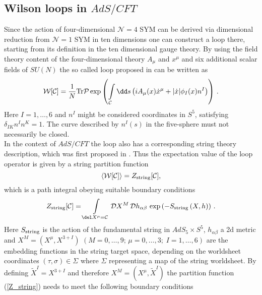 \subsection{Wilson loops in $AdS/CFT$}
Since the action of four-dimensional $\mathcal{N}=4$ SYM can be derived via dimensional reduction from $\mathcal{N}=1$ SYM in ten dimensions \cite{BRINK197777} one can construct a  loop there, starting from its definition in the ten dimensional gauge theory. By using the field theory content of the four-dimensional theory $A_{\mu}$ and $x^{\mu}$ and six additional scalar fields of $SU(N)$ the so called  loop proposed in \cite{maldacena2} can be written as
%
%
\begin{equation}
\mathcal{W}[\mathcal{C}] = \frac{1}{N}{\rm Tr}\mathcal{P} \exp \left( \int\limits_{\mathcal{C}} \dd s \left( i A_{\mu}(x)\dot{x}^{\mu} +
\vert \dot{x}\vert \phi_{I}(x) n^{I} \right) \right) \,.
\end{equation}
%
%
Here $I=1,\ldots,6$ and $n^{I}$ might be considered coordinates in $S^{5}$, satisfying $\delta_{IK}n^{I}n^{K}=1$. The curve described by $n^{I}(s)$ in the five-sphere must not necessarily be closed. \\
%
%
In the context of $AdS/CFT$ the  loop also has a corresponding string theory description, which was first proposed in \cite{maldacena2}. Thus the expectation value of the  loop operator is given by a string partition function
%
%
\begin{equation}
\langle \mathcal{W}[\mathcal{C}]\rangle = Z_{\rm string}[\mathcal{C}],
\label{W_Z}
\end{equation}
%
%
which is a path integral obeying suitable boundary conditions
%
%
\begin{equation}
Z_{\rm string}[\mathcal{C}] = \int\limits_{\del X^{\mu}=\mathcal{C}} \mathcal{D}X^{M}\, \mathcal{D}h_{\alpha\beta}\, \exp \left(-S_{\rm string}\left( X,h \right) \right)\,.
\label{Z_string}
\end{equation}
%
%
Here $S_{\rm string}$ is the action of the fundamental string in $AdS_{5}\times S^{5}$, $h_{\alpha\beta}$ a 2d metric and ${X^{M}=(X^{\mu},X^{3+I})}$ ${(M=0,\ldots,9;\, \mu=0,\ldots,3; \; I=1,\ldots,6)}$ are the embedding functions in the string target space, depending on the worldsheet coordinates $(\tau,\sigma)\in \Sigma$ where $\Sigma$ representing a map of the string worldsheet. By defining $\widetilde{X}^{I}=X^{3+I}$ and therefore $X^{M}=(X^{\mu},\widetilde{X}^{I})$ the partition function (\ref{Z_string}) needs to meet the following boundary conditions
